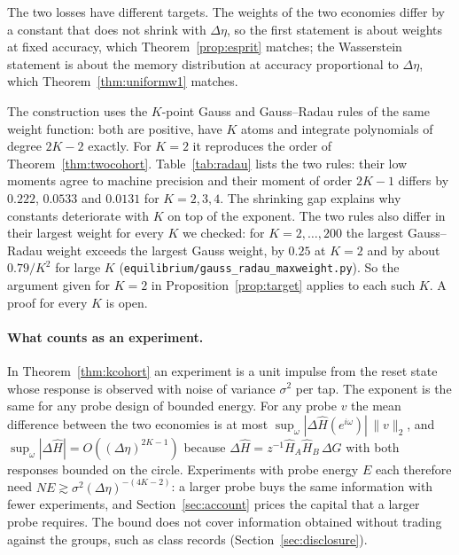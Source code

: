 The two losses have different targets. The weights of the two economies differ by a constant that does not shrink with $\Delta\eta$, so the first statement is about weights at fixed accuracy, which Theorem~\ref{prop:esprit} matches; the Wasserstein statement is about the memory distribution at accuracy proportional to $\Delta\eta$, which Theorem~\ref{thm:uniformw1} matches.

The construction uses the $K$-point Gauss and Gauss--Radau rules of the same weight function: both are positive, have $K$ atoms and integrate polynomials of degree $2K-2$ exactly. For $K=2$ it reproduces the order of Theorem~\ref{thm:twocohort}. Table~\ref{tab:radau} lists the two rules: their low moments agree to machine precision and their moment of order $2K-1$ differs by $0.222$, $0.0533$ and $0.0131$ for $K=2,3,4$. The shrinking gap explains why constants deteriorate with $K$ on top of the exponent. The two rules also differ in their largest weight for every $K$ we checked: for $K=2,\ldots,200$ the largest Gauss--Radau weight exceeds the largest Gauss weight, by $0.25$ at $K=2$ and by about $0.79/K^2$ for large $K$ (\nolinkurl{equilibrium/gauss_radau_maxweight.py}). So the argument given for $K=2$ in Proposition~\ref{prop:target} applies to each such $K$. A proof for every $K$ is open.

\paragraph{What counts as an experiment.} In Theorem~\ref{thm:kcohort} an experiment is a unit impulse from the reset state whose response is observed with noise of variance $\sigma^2$ per tap. The exponent is the same for any probe design of bounded energy. For any probe $v$ the mean difference between the two economies is at most $\sup_\omega|\Delta\hat H(e^{i\omega})|\,\|v\|_2$, and $\sup_\omega|\Delta\hat H|=O((\Delta\eta)^{2K-1})$ because $\Delta\hat H=z^{-1}\hat H_A\hat H_B\,\Delta G$ with both responses bounded on the circle. Experiments with probe energy $E$ each therefore need $NE\gtrsim\sigma^2(\Delta\eta)^{-(4K-2)}$: a larger probe buys the same information with fewer experiments, and Section~\ref{sec:account} prices the capital that a larger probe requires. The bound does not cover information obtained without trading against the groups, such as class records (Section~\ref{sec:disclosure}).

